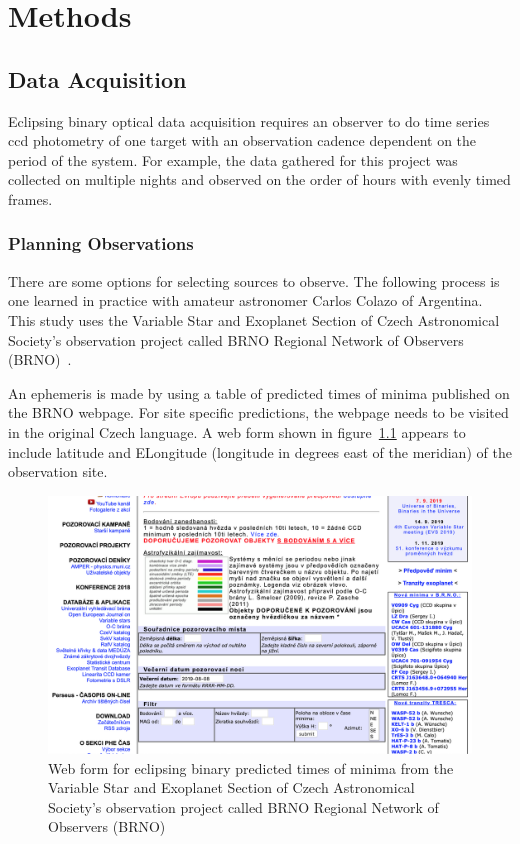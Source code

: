 \chapter{Methods}
\label{chp:data}

\section{Data Acquisition}
Eclipsing binary optical data acquisition requires an observer to do time series ccd photometry
of one target with an observation cadence dependent on the period of the system.
For example, the data gathered for this project was collected on multiple nights and observed on the order of hours with evenly timed frames.

\subsection{Planning Observations}
There are some options for selecting sources to observe.
The following process is one learned in practice with amateur astronomer Carlos Colazo of Argentina.
This study uses the Variable Star and Exoplanet Section of Czech Astronomical Society's observation project called
BRNO Regional Network of Observers (BRNO)~\cite{brno}.

An ephemeris is made by using a table of predicted times of minima published on the BRNO webpage.
For site specific predictions, the webpage needs to be visited in the original Czech language.
A web form shown in figure~\ref{fig:brno} appears to include latitude and ELongitude (longitude in degrees east of the meridian) of the observation site.
\begin{figure}[h]
    \centering
    \includegraphics[width=\columnwidth]{figures/brno.png}
    \caption{Web form for eclipsing binary predicted times of minima from the Variable Star and Exoplanet Section of Czech Astronomical Society's observation project called BRNO Regional Network of Observers (BRNO)}
\label{fig:brno}
\end{figure}

